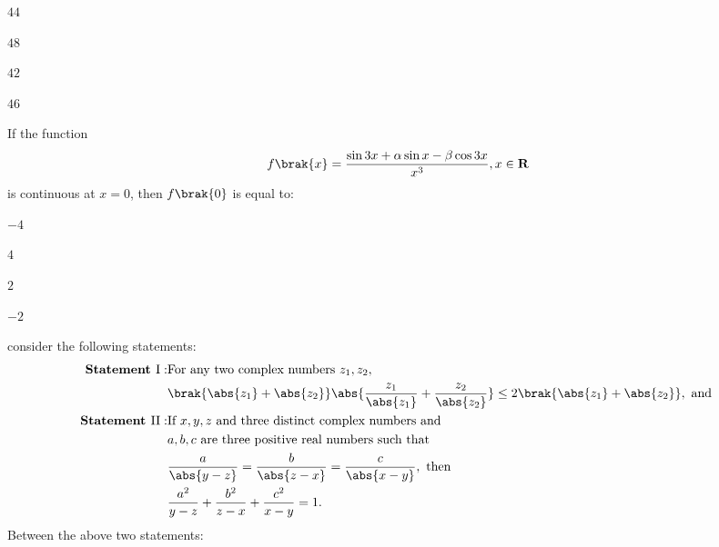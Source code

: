     \hfill{}

    \begin{enumerate}
    \begin{multicols}{4}
        \item $44$
        \item $48$
        \item $42$
        \item $46$
    \end{multicols}   
    \end{enumerate}

    \item 
    If the function 
    \begin{align*}
        f\brak{x} = \frac{\sin{3x} + \alpha\sin{x} - \beta\cos{3x}}{x^3}, x \in \mathbf{R}
    \end{align*}
    is continuous at $x = 0$, then $f\brak{0}$ is equal to:

    \hfill{}

    \begin{enumerate}
    \begin{multicols}{4}
        \item $-4$
        \item $4$
        \item $2$
        \item $-2$
    \end{multicols}   
    \end{enumerate}

    \item 
    consider the following statements: 
    \begin{align*}
        \textbf{Statement }\mathrm{I:} & \text{For any two complex numbers } z_1, z_2, \\
        & \brak{\abs{z_1} + \abs{z_2}}\abs{\frac{z_1}{\abs{z_1}} + \frac{z_2}{\abs{z_2}}} \leq 2\brak{\abs{z_1} + \abs{z_2}}, \text{ and }\\
        \textbf{Statement }\mathrm{II:} & \text{If } x, y, z \text{ and three distinct complex numbers and } \\
        & a, b, c \text{ are three positive real numbers such that } \\
        & \frac{a}{\abs{y - z}} = \frac{b}{\abs{z - x}} = \frac{c}{\abs{x - y}}, \text{ then} \\
        & \frac{a^2}{y - z} + \frac{b^2}{z - x} + \frac{c^2}{x - y} = 1.
    \end{align*}
    Between the above two statements: 

